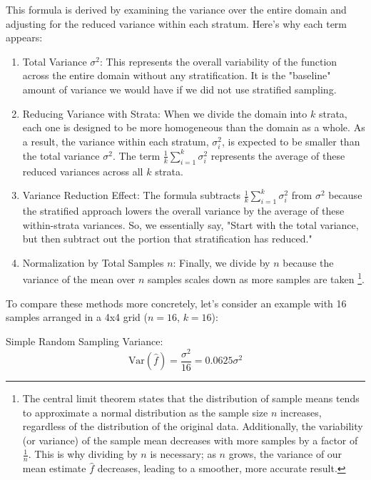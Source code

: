 \documentclass[12pt]{article}
\begin{document}
This formula is derived by examining the variance over the entire domain and adjusting for the reduced variance within each stratum. Here’s why each term appears:

\begin{enumerate}
    \item Total Variance $\sigma^2$: This represents the overall variability of the function across the entire domain without any stratification. It is the "baseline" amount of variance we would have if we did not use stratified sampling.

    \item Reducing Variance with Strata: When we divide the domain into $k$ strata, each one is designed to be more homogeneous than the domain as a whole. As a result, the variance within each stratum, $\sigma_i^2$, is expected to be smaller than the total variance $\sigma^2$. The term $\frac{1}{k} \sum_{i=1}^k \sigma_i^2$ represents the average of these reduced variances across all $k$ strata.

    \item Variance Reduction Effect: The formula subtracts $\frac{1}{k} \sum_{i=1}^k \sigma_i^2$ from $\sigma^2$ because the stratified approach lowers the overall variance by the average of these within-strata variances. So, we essentially say, "Start with the total variance, but then subtract out the portion that stratification has reduced."

    \item Normalization by Total Samples $n$: Finally, we divide by $n$ because the variance of the mean over $n$ samples scales down as more samples are taken \footnote{The central limit theorem states that the distribution of sample means tends to approximate a normal distribution as the sample size $n$ increases, regardless of the distribution of the original data. Additionally, the variability (or variance) of the sample mean decreases with more samples by a factor of $\frac{1}{n}$. This is why dividing by $n$ is necessary; as $n$ grows, the variance of our mean estimate $\hat{f}$ decreases, leading to a smoother, more accurate result.}.

\end{enumerate}

To compare these methods more concretely, let's consider an example with 16 samples arranged in a 4x4 grid ($n = 16$, $k = 16$):

Simple Random Sampling Variance:
\[
    \text{Var}(\hat{f}) = \frac{\sigma^2}{16} = 0.0625\sigma^2
\]
\end{document}
